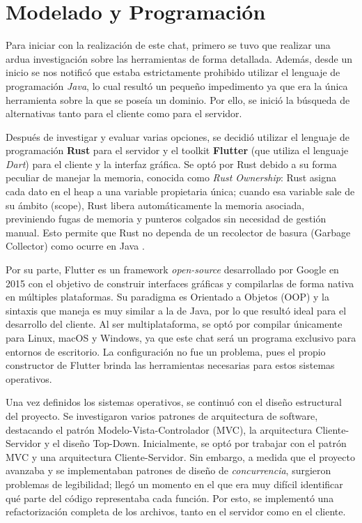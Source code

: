 \section{Modelado y Programación}

Para iniciar con la realización de este chat, primero se tuvo que realizar una ardua investigación sobre las herramientas de forma detallada. Además, desde un inicio se nos notificó que estaba estrictamente prohibido utilizar el lenguaje de programación \textit{Java}, lo cual resultó un pequeño impedimento ya que era la única herramienta sobre la que se poseía un dominio. Por ello, se inició la búsqueda de alternativas tanto para el cliente como para el servidor. 

Después de investigar y evaluar varias opciones, se decidió utilizar el lenguaje de programación \textbf{Rust} para el servidor y el toolkit \textbf{Flutter} (que utiliza el lenguaje \textit{Dart}) para el cliente y la interfaz gráfica. Se optó por Rust debido a su forma peculiar de manejar la memoria, conocida como \textit{Rust Ownership}: Rust asigna cada dato en el heap a una variable propietaria única; cuando esa variable sale de su ámbito (scope), Rust libera automáticamente la memoria asociada, previniendo fugas de memoria y punteros colgados sin necesidad de gestión manual. Esto permite que Rust no dependa de un recolector de basura (Garbage Collector) como ocurre en Java \cite{rust-ownership}.

Por su parte, Flutter es un framework \textit{open-source} desarrollado por Google en 2015 con el objetivo de construir interfaces gráficas y compilarlas de forma nativa en múltiples plataformas. Su paradigma es Orientado a Objetos (OOP) y la sintaxis que maneja es muy similar a la de Java, por lo que resultó ideal para el desarrollo del cliente. Al ser multiplataforma, se optó por compilar únicamente para Linux, macOS y Windows, ya que este chat será un programa exclusivo para entornos de escritorio. La configuración no fue un problema, pues el propio constructor de Flutter brinda las herramientas necesarias para estos sistemas operativos.

Una vez definidos los sistemas operativos, se continuó con el diseño estructural del proyecto. Se investigaron varios patrones de arquitectura de software, destacando el patrón Modelo-Vista-Controlador (MVC), la arquitectura Cliente-Servidor y el diseño Top-Down. Inicialmente, se optó por trabajar con el patrón MVC y una arquitectura Cliente-Servidor. Sin embargo, a medida que el proyecto avanzaba y se implementaban patrones de diseño de \textit{concurrencia}, surgieron problemas de legibilidad; llegó un momento en el que era muy difícil identificar qué parte del código representaba cada función. Por esto, se implementó una refactorización completa de los archivos, tanto en el servidor como en el cliente.

